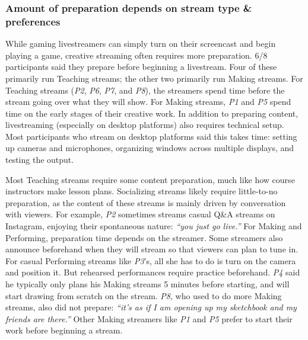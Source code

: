 \subsubsection{Amount of preparation depends on stream type \& preferences}
While gaming livestreamers can simply turn on their screencast and begin playing a game, creative streaming often requires more preparation. 6/8 participants said they prepare before beginning a livestream. Four of these primarily run Teaching streams; the other two primarily run Making streams. For Teaching streams (\textit{P2}, \textit{P6}, \textit{P7}, and \textit{P8}), the streamers spend time before the stream going over what they will show. For Making streams, \textit{P1} and \textit{P5} spend time on the early stages of their creative work. In addition to preparing content, livestreaming (especially on desktop platforms) also requires technical setup. Most participants who stream on desktop platforms said this takes time: setting up cameras and microphones, organizing windows across multiple displays, and testing the output.

Most Teaching streams require some content preparation, much like how course instructors make lesson plans. Socializing streams likely require little-to-no preparation, as the content of these streams is mainly driven by conversation with viewers. For example, \textit{P2} sometimes streams casual Q\&A streams on Instagram, enjoying their spontaneous nature: \textit{``you just go live.''} For Making and Performing, preparation time depends on the streamer. Some streamers also announce beforehand when they will stream so that viewers can plan to tune in.
For casual Performing streams like \textit{P3}'s, all she has to do is turn on the camera and position it. But rehearsed performances require practice beforehand. \textit{P4} said he typically only plans his Making streams 5 minutes before starting, and will start drawing from scratch on the stream. \textit{P8}, who used to do more Making streams, also did not prepare: \textit{``it's as if I am opening up my sketchbook and my friends are there.''} Other Making streamers like \textit{P1} and \textit{P5} prefer to start their work before beginning a stream.

